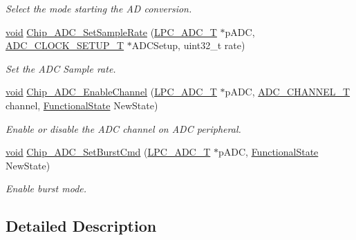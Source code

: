 \begin{DoxyCompactItemize}
\begin{DoxyCompactList}\small\item\em Select the mode starting the A\-D conversion. \end{DoxyCompactList}\item 
\hyperlink{Paradigm_2Tern__EE_2small_2portmacro_8h_a14d32f8130d3c0b212cfc751730b5b49}{void} \hyperlink{group__ADC__17XX__40XX_gae1629ea72c61a224e69e55f7699b7810}{Chip\-\_\-\-A\-D\-C\-\_\-\-Set\-Sample\-Rate} (\hyperlink{structLPC__ADC__T}{L\-P\-C\-\_\-\-A\-D\-C\-\_\-\-T} $\ast$p\-A\-D\-C, \hyperlink{structADC__CLOCK__SETUP__T}{A\-D\-C\-\_\-\-C\-L\-O\-C\-K\-\_\-\-S\-E\-T\-U\-P\-\_\-\-T} $\ast$A\-D\-C\-Setup, uint32\-\_\-t rate)
\begin{DoxyCompactList}\small\item\em Set the A\-D\-C Sample rate. \end{DoxyCompactList}\item 
\hyperlink{Paradigm_2Tern__EE_2small_2portmacro_8h_a14d32f8130d3c0b212cfc751730b5b49}{void} \hyperlink{group__ADC__17XX__40XX_gaf2fd510be97c2747ed3c53c132a45e15}{Chip\-\_\-\-A\-D\-C\-\_\-\-Enable\-Channel} (\hyperlink{structLPC__ADC__T}{L\-P\-C\-\_\-\-A\-D\-C\-\_\-\-T} $\ast$p\-A\-D\-C, \hyperlink{group__ADC__17XX__40XX_ga30ee7058bc7cc1daff718b29b42bed4e}{A\-D\-C\-\_\-\-C\-H\-A\-N\-N\-E\-L\-\_\-\-T} channel, \hyperlink{group__LPC__Types__Public__Types_gac9a7e9a35d2513ec15c3b537aaa4fba1}{Functional\-State} New\-State)
\begin{DoxyCompactList}\small\item\em Enable or disable the A\-D\-C channel on A\-D\-C peripheral. \end{DoxyCompactList}\item 
\hyperlink{Paradigm_2Tern__EE_2small_2portmacro_8h_a14d32f8130d3c0b212cfc751730b5b49}{void} \hyperlink{group__ADC__17XX__40XX_gaa9890ccee17bea824b2af26e5bb2f1d6}{Chip\-\_\-\-A\-D\-C\-\_\-\-Set\-Burst\-Cmd} (\hyperlink{structLPC__ADC__T}{L\-P\-C\-\_\-\-A\-D\-C\-\_\-\-T} $\ast$p\-A\-D\-C, \hyperlink{group__LPC__Types__Public__Types_gac9a7e9a35d2513ec15c3b537aaa4fba1}{Functional\-State} New\-State)
\begin{DoxyCompactList}\small\item\em Enable burst mode. \end{DoxyCompactList}\end{DoxyCompactItemize}


\subsection{Detailed Description}


